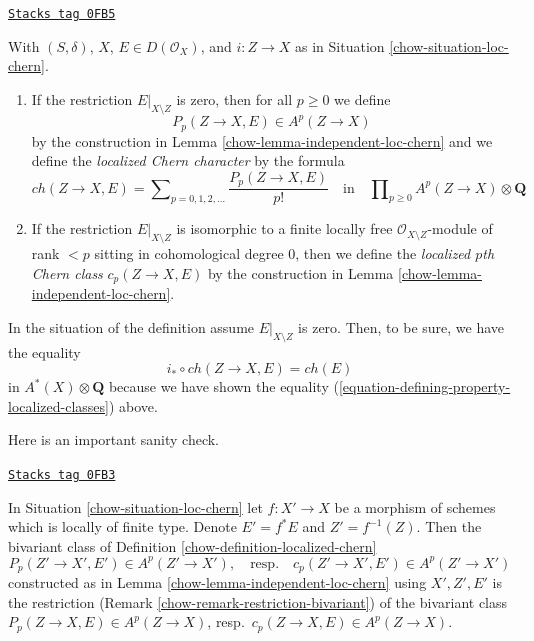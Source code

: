 \begin{definition}
\label{chow-definition-localized-chern}
\href{https://stacks.math.columbia.edu/tag/0FB5}{\texttt{Stacks tag 0FB5}}

With $(S, \delta)$, $X$, $E \in D(\mathcal{O}_X)$, and $i : Z \to X$ as in
Situation \ref{chow-situation-loc-chern}.
\begin{enumerate}
\item If the restriction $E|_{X \setminus Z}$ is zero, then for all
$p \geq 0$ we define
$$
P_p(Z \to X, E) \in A^p(Z \to X)
$$
by the construction in Lemma \ref{chow-lemma-independent-loc-chern}
and we define the {\it localized Chern character} by the formula
$$
ch(Z \to X, E) =
\sum\nolimits_{p = 0, 1, 2, \ldots} \frac{P_p(Z \to X, E)}{p!}
\quad\text{in}\quad \prod\nolimits_{p \geq 0} A^p(Z \to X) \otimes \mathbf{Q}
$$
\item If the restriction $E|_{X \setminus Z}$ is isomorphic to a
finite locally free $\mathcal{O}_{X \setminus Z}$-module of rank $< p$
sitting in cohomological degree $0$, then we define the
{\it localized $p$th Chern class} $c_p(Z \to X, E)$ by the construction
in Lemma \ref{chow-lemma-independent-loc-chern}.
\end{enumerate}
\end{definition}

In the situation of the definition assume $E|_{X \setminus Z}$ is zero.
Then, to be sure, we have the equality
$$
i_* \circ ch(Z \to X, E) = ch(E)
$$
in $A^*(X) \otimes \mathbf{Q}$ because we have shown the
equality (\ref{equation-defining-property-localized-classes}) above.

\medskip\noindent
Here is an important sanity check.

\begin{lemma}
\label{chow-lemma-base-change-loc-chern}
\href{https://stacks.math.columbia.edu/tag/0FB3}{\texttt{Stacks tag 0FB3}}

In Situation \ref{chow-situation-loc-chern}
let $f : X' \to X$ be a morphism of schemes which is locally of finite type.
Denote $E' = f^*E$ and $Z' = f^{-1}(Z)$. Then the bivariant class
of Definition \ref{chow-definition-localized-chern}
$$
P_p(Z' \to X', E') \in A^p(Z' \to X'),
\quad\text{resp.}\quad
c_p(Z' \to X', E') \in A^p(Z' \to X')
$$
constructed as in Lemma \ref{chow-lemma-independent-loc-chern}
using $X', Z', E'$ is the restriction
(Remark \ref{chow-remark-restriction-bivariant}) of the
bivariant class $P_p(Z \to X, E) \in A^p(Z \to X)$,
resp.\ $c_p(Z \to X, E) \in A^p(Z \to X)$.
\end{lemma}

